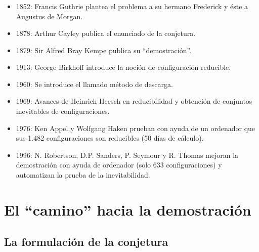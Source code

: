 \documentclass[spanish, utf8,handout]{beamer} %
\theoremstyle{definition}
\begin{document}
\begin{frame}\transblindsvertical
\frametitle{\insertsubsection}

\begin{itemize}
	\item 1852: Francis Guthrie plantea el problema a su hermano Frederick y éste a Augustus de Morgan.
	
	\item  1878: Arthur Cayley publica el enunciado de la conjetura.
	
	\item  1879: Sir Alfred Bray Kempe publica su ``demostración''.
	
	\item  1913: George Birkhoff introduce la noción de configuración reducible.
	
	\item  1960: Se introduce el llamado método de descarga.
	
	\item  1969: Avances de Heinrich Heesch en reducibilidad y obtención de conjuntos inevitables de configuraciones.
	
	\item 1976: Ken Appel y Wolfgang Haken prueban con ayuda de un ordenador que sus 1.482 configuraciones son reducibles (50 días de cálculo).
	
	\item  1996: N. Robertson, D.P. Sanders, P. Seymour y R. Thomas mejoran la demostración con ayuda de ordenador (solo 633 configuraciones) y automatizan la prueba de la inevitabilidad.
\end{itemize}   
\end{frame}

\section{El ``camino'' hacia la demostración}

\subsection{La formulación de la conjetura}
\end{document}

